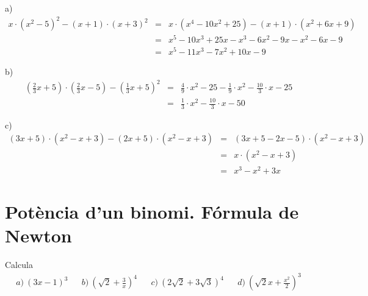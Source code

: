 \begin{solucio}
a)\begin{eqnarray*}
x\cdot (x^{2}-5)^{2}-(x+1)\cdot (x+3)^{2} &=&x\cdot \left(
x^{4}-10x^{2}+25\right) -(x+1)\cdot (x^{2}+6x+9) \\
&=&x^{5}-10x^{3}+25x-x^{3}-6x^{2}-9x-x^{2}-6x-9 \\
&=&x^{5}-11x^{3}-7x^{2}+10x-9
\end{eqnarray*}

b)\begin{eqnarray*}
\left( \frac{2}{3}x+5\right) \cdot \left( \frac{2}{3}x-5\right) -\left(
\frac{1}{3}x+5\right) ^{2} &=&\frac{4}{9}\cdot x^{2}-25-\frac{1}{9}\cdot
x^{2}-\frac{10}{3}\cdot x-25 \\
&=&\frac{1}{3}\cdot x^{2}-\frac{10}{3}\cdot x-50
\end{eqnarray*}

c)\begin{eqnarray*}
(3x+5)\cdot (x^{2}-x+3)-(2x+5)\cdot (x^{2}-x+3) &=&(3x+5-2x-5)\cdot
(x^{2}-x+3) \\
&=&x\cdot (x^{2}-x+3) \\
&=&x^{3}-x^{2}+3x
\end{eqnarray*}
\end{solucio}

\section{Potència d'un binomi. Fórmula de Newton}

\begin{exercici}
Calcula\[
\begin{array}{ccccccc}
a)~\left( 3x-1\right) ^{3} & & b)~\left( \sqrt{2}+\frac{3}{x}\right) ^{4} &
& c)~\left( 2\sqrt{2}+3\sqrt{3}\right) ^{4} & & d)~\left( \sqrt{2}x+\frac{x^{2}}{2}\right) ^{3}\end{array}\]
\end{exercici}

